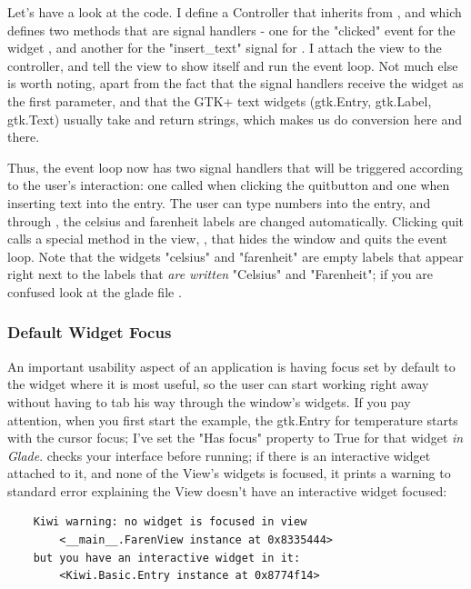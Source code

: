 \documentclass[a4paper]{howto}
\begin{document}


Let's have a look at the code. I define a Controller
 that inherits from , and
which defines two methods that are signal handlers - one for the
"clicked" event for the widget , and another for the
"insert\_text" signal for . I attach the view to the
controller, and tell the view to show itself and run the event loop. Not
much else is worth noting, apart from the fact that the signal handlers
receive the widget as the first parameter, and that the GTK+ text
widgets (gtk.Entry, gtk.Label, gtk.Text) usually take and return strings,
which makes us do conversion here and there.

Thus, the event loop now has two signal handlers that will be triggered
according to the user's interaction: one called when clicking the
quitbutton and one when inserting text into the entry. The user can type
numbers into the entry, and through
, the celsius and farenheit
labels are changed automatically. Clicking quit calls a special method
in the view, , that hides the window and quits
the event loop. Note that the widgets "celsius" and "farenheit" are
empty labels that appear right next to the labels that {\it are written}
"Celsius" and "Farenheit"; if you are confused look at the glade file
.

\subsubsection{Default Widget Focus}

An important usability aspect of an application is having focus set by
default to the widget where it is most useful, so the user can start
working right away without having to tab his way through the window's
widgets. If you pay attention, when you first start the 
example, the gtk.Entry for temperature starts with the cursor focus; I've
set the "Has focus" property to True for that widget {\it in Glade}.
 checks your interface before running; if there
is an interactive widget attached to it, and none of the View's widgets
is focused, it prints a warning to standard error explaining the View
doesn't have an interactive widget focused:

    \begin{verbatim}
    Kiwi warning: no widget is focused in view
        <__main__.FarenView instance at 0x8335444>
    but you have an interactive widget in it:
        <Kiwi.Basic.Entry instance at 0x8774f14>
    \end{verbatim}
\end{document}
